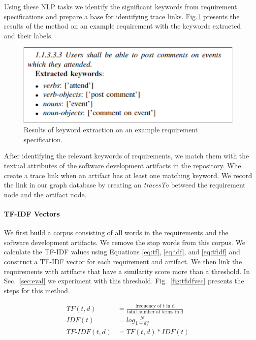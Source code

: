   Using these NLP tasks we identify the significant keywords from requirement specifications and prepare a base for identifying trace links. Fig.\ref{fig:keywords} presents the results of the method on an example requirement with the keywords extracted and their labels.

  \begin{figure}[htb]
    \centering
    \includegraphics[width=.96\linewidth]{figs/keywords.png}
    \caption{Results of keyword extraction on an example requirement specification.}
    \label{fig:keywords}
  \end{figure}

  After identifying the relevant keywords of requirements, we match them with the textual attributes of the software development artifacts in the repository. Whe create a trace link when an artifact has at least one matching keyword. We record the link in our graph database by creating an \emph{tracesTo} betweed the requirement node and the artifact node.

  \paragraph{TF-IDF Vectors} We first build a corpus consisting of all words in the requirements and the software development artifacts. We remove the stop words from this corpus. We calculate the TF-IDF values using Equations \ref{eq:tf}, \ref{eq:idf}, and \ref{eq:tfidf} and construct a TF-IDF vector for each requirement and artifact. We then link the requirements with artifacts that have a similarity score more than a threshold. In Sec.~\ref{sec:eval} we experiment with this threshold. Fig.~\ref{fig:tfidfvec} presents the steps for this method.

  \begin{align}
    TF(t,d) &= \frac{\text{frequency of t in d}}{\text{total number of terms in d}} \label{eq:tf} \\
    IDF(t) &= log\frac{N}{1+df} \label{eq:idf}\\
    TF\text{-}IDF(t,d) &= TF(t,d)*IDF(t) \label{eq:tfidf}
  \end{align}


